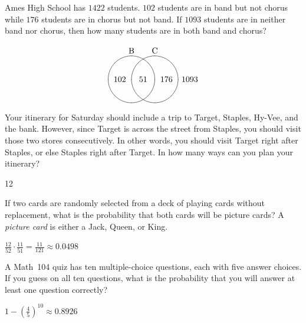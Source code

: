 \documentclass[answers,addpoints,12pt]{exam}
\begin{document}
\begin{questions}
\begin{solution}
\end{solution}

\question[12] Ames High School has $1422$ students.
$102$ students are in band but not chorus while
$176$ students are in chorus but not band.
If $1093$ students are in neither band nor chorus,
then how many students are in both band and chorus?
\begin{solution}
\[\begin{xy}<.5cm,0cm>:
(-1,2)*+!D{\text{B}};
(1,2)*+!D{\text{C}};
(-1,0)*\cir<1cm>{};
(1,0)*\cir<1cm>{};
(0,0)*{51};
(-2,0)*{102};
(2,0)*{176};
(4,0)*{1093};
\end{xy}\]
\end{solution}

\question[15] Your itinerary for Saturday should
include a trip to Target, Staples, Hy-Vee, and the bank.
However, since Target is across the street from Staples,
you should visit those two stores consecutively. In other
words, you should visit Target right after Staples, or else
Staples right after Target. In how many ways
can you plan your itinerary?
\begin{solution}12\end{solution}

\question[10] If two cards are randomly selected from a deck
of playing cards without replacement, what is the probability that both cards
will be picture cards?  A {\em picture card} is either a Jack, Queen, or King.
\begin{solution}
$\frac{12}{52}\cdot\frac{11}{51}=\frac{11}{121}\approx 0.0498$
\end{solution}

\question[12] A Math~104 quiz has ten multiple-choice
questions, each with five answer choices. If you guess on all
ten questions, what is the probability that you will answer at
least one question correctly?
\begin{solution}
$1-\left(\frac{4}{5}\right)^{10}\approx 0.8926$
\end{solution}

\end{questions}

\vfill
\begin{center}\gradetable[h][questions]\end{center}
\end{document}
